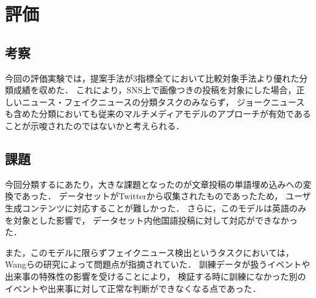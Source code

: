 \section{評価}\label{ch:evaluate}

\subsection{考察}
今回の評価実験では，提案手法が3指標全てにおいて比較対象手法より優れた分類成績を収めた．
これにより，SNS上で画像つきの投稿を対象にした場合，正しいニュース・フェイクニュースの分類タスクのみならず，
ジョークニュースも含めた分類においても従来のマルチメディアモデルのアプローチが有効であることが示唆されたのではないかと考えられる．

\subsection{課題}
今回分類するにあたり，大きな課題となったのが文章投稿の単語埋め込みへの変換であった．
データセットがTwitterから収集されたものであったため，
ユーザ生成コンテンツに対応することが難しかった．
さらに，このモデルは英語のみを対象とした影響で，
データセット内他国語投稿に対して対応ができなかった．

また，このモデルに限らずフェイクニュース検出というタスクにおいては，Wangらの研究\cite{Wang:2018:EEA:3219819.3219903}によって問題点が指摘されていた．
訓練データが扱うイベントや出来事の特殊性の影響を受けることにより，
検証する時に訓練になかった別のイベントや出来事に対して正常な判断ができなくなる点であった．
%